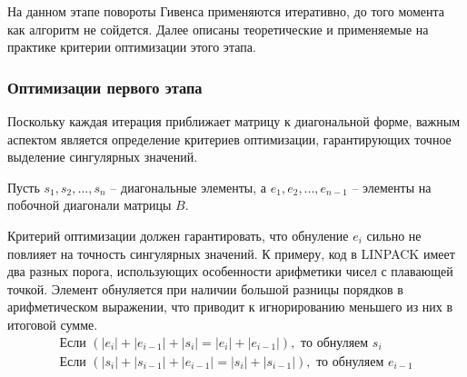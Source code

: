 На данном этапе повороты Гивенса применяются итеративно, до того момента как алгоритм не сойдется. Далее описаны теоретические и применяемые на практике критерии оптимизации этого этапа.

\subsubsection{Оптимизации первого этапа}

 Поскольку каждая итерация приближает матрицу к диагональной форме, важным аспектом является определение критериев оптимизации, гарантирующих точное выделение сингулярных значений.


Пусть $s_1, s_2,...,s_n$ \--- диагональные элементы, а $e_1, e_2, ..., e_{n-1}$ \--- элементы на побочной диагонали матрицы $B$. 

Критерий оптимизации должен гарантировать, что обнуление $e_i$ сильно не повлияет на точность сингулярных значений. К примеру, код в LINPACK \cite{Dongarra1979} имеет два разных порога, использующих особенности арифметики чисел с плавающей точкой. Элемент обнуляется при наличии большой разницы порядков в арифметическом выражении, что приводит к игнорированию меньшего из них в итоговой сумме.
\begin{align}
\text{Если } (|e_i| + |e_{i-1}| + |s_i| = |e_i| + |e_{i-1}|), \text{ то обнуляем }s_i \label{eq:1:1:1}
\\\text{Если } (|s_i| + |s_{i-1}| + |e_{i-1}| = |s_i| + |s_{i-1}|), \text{ то обнуляем }e_{i-1} \label{eq:1:1:2}
\end{align}

